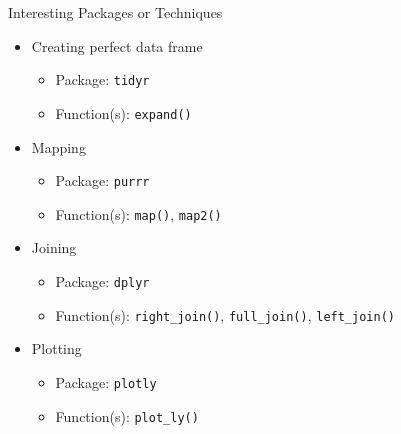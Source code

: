 \documentclass[
  ignorenonframetext,
]{beamer}
\providecommand{\tightlist}{%
  \setlength{\itemsep}{0pt}\setlength{\parskip}{0pt}}
\begin{document}
\begin{frame}[fragile]{Interesting Packages or Techniques}
\protect\hypertarget{interesting-packages-or-techniques}{}

\begin{itemize}
\tightlist
\item
  Creating perfect data frame

  \begin{itemize}
  \tightlist
  \item
    Package: \texttt{tidyr}
  \item
    Function(s): \texttt{expand()} 
  \end{itemize}
\item
  Mapping

  \begin{itemize}
  \tightlist
  \item
    Package: \texttt{purrr}
  \item
    Function(s): \texttt{map()}, \texttt{map2()} 
  \end{itemize}
\item
  Joining

  \begin{itemize}
  \tightlist
  \item
    Package: \texttt{dplyr}
  \item
    Function(s): \texttt{right\_join()}, \texttt{full\_join()},
    \texttt{left\_join()} 
  \end{itemize}
\item
  Plotting

  \begin{itemize}
  \tightlist
  \item
    Package: \texttt{plotly}
  \item
    Function(s): \texttt{plot\_ly()}
  \end{itemize}
\end{itemize}

\end{frame}
\end{document}
